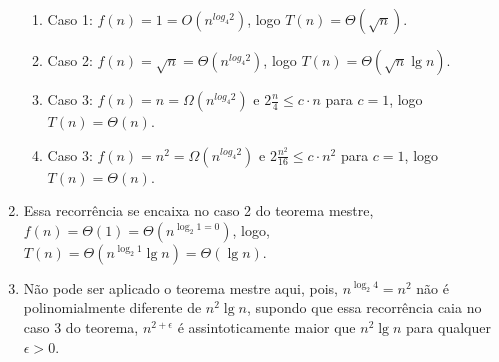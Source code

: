 \documentclass{article}
\begin{document}
\begin{enumerate}
\begin{enumerate}
		\item Caso 1: $f(n) = 1 = O(n^{log_4 2})$, logo $T(n) =
		\Theta(\sqrt{n})$.

		\item Caso 2: $f(n) = \sqrt{n} = \Theta(n^{log_4 2})$, logo $T(n) =
		\Theta(\sqrt{n}\lg n)$.

		\item Caso 3: $f(n) = n = \Omega(n^{log_4 2})$ e $2\frac{n}{4} \leq c
		\cdot n$ para $c=1$, logo $T(n) = \Theta(n)$.

		\item Caso 3: $f(n) = n^2 = \Omega(n^{log_4 2})$ e $2\frac{n^2}{16}
		\leq c \cdot n^2$ para $c=1$, logo $T(n) = \Theta(n)$.

	\end{enumerate}

	\item Essa recorrência se encaixa no caso 2 do teorema mestre, $f(n) =
	\Theta(1) = \Theta(n^{\log_2 1 = 0})$, logo, $T(n) = \Theta(n^{\log_2 1}
	\lg n) = \Theta(\lg n)$.

	\item Não pode ser aplicado o teorema mestre aqui, pois, $n^{\log_2 4} =
	n^2$ não é polinomialmente diferente de $n^2 \lg n$, supondo que essa
	recorrência caia no caso 3 do teorema, $n^{2+\epsilon}$ é assintoticamente
	maior que $n^2 \lg n$ para qualquer $\epsilon > 0$.

\end{enumerate}
\end{document}
